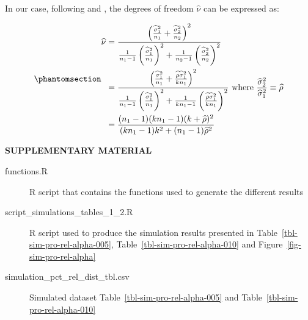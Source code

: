 \documentclass[
  12pt]{article}
\begin{document}
In our case, following \citet{satterthwaite_approximate_1946} and
\citet{welch_generalization_1947}, the degrees of freedom
\(\widehat{\nu}\) can be expressed as:

\begin{equation}\phantomsection\label{eq-df-ws}{\begin{split}
  \widehat{\nu} & = \frac{\left( \frac{\widehat{\sigma}^2_1}{n_1} + \frac{\widehat{\sigma}^2_2}{n_2} \right)^2}{\frac{1}{n_1-1} \left( \frac{\widehat{\sigma}^2_1}{n_1} \right)^2 + \frac{1}{n_2-1} \left( \frac{\widehat{\sigma}^2_2}{n_2} \right)^2} \\
  & = \frac{\left( \frac{\widehat{\sigma}^2_1}{n_1} + \frac{\widehat{\rho}\widehat{\sigma}^2_1}{kn_1} \right)^2}{\frac{1}{n_1-1} \left( \frac{\widehat{\sigma}^2_1}{n_1} \right)^2 + \frac{1}{kn_1-1} \left( \frac{\widehat{\rho}\widehat{\sigma}^2_1}{kn_1} \right)^2} \text{ where } \frac{\widehat{\sigma}^2_2}{\widehat{\sigma}^2_1} \equiv \widehat{\rho} \\
  & = \frac{(n_1-1)(kn_1-1)(k+\widehat{\rho})^2}{(kn_1-1)k^2 + (n_1-1)\widehat{\rho}^2}
  \end{split}}\end{equation}

\label{supplementary-material}
\bigskip

\begin{center}

{\large\bf SUPPLEMENTARY MATERIAL}

\end{center}

\begin{description}
\item[functions.R]
R script that contains the functions used to generate the different
results
\item[script\_simulations\_tables\_1\_2.R]
R script used to produce the simulation results presented in
Table~\ref{tbl-sim-pro-rel-alpha-005},
Table~\ref{tbl-sim-pro-rel-alpha-010} and
Figure~\ref{fig-sim-pro-rel-alpha}
\item[simulation\_pct\_rel\_dist\_tbl.csv]
Simulated dataset Table~\ref{tbl-sim-pro-rel-alpha-005} and
Table~\ref{tbl-sim-pro-rel-alpha-010}
\end{description}


\renewcommand\refname{References}
  
\end{document}
